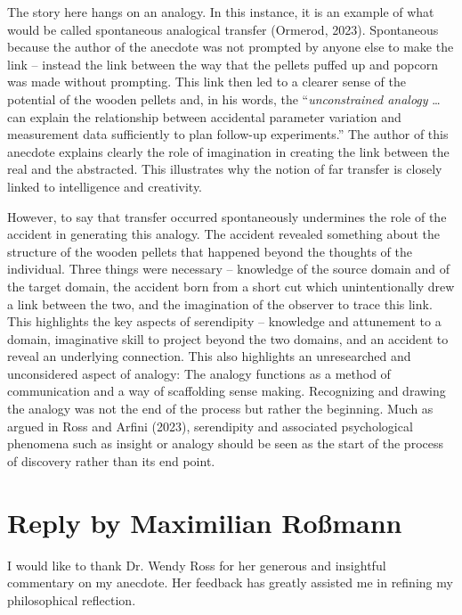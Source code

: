 \documentclass[authordate, commentary]{jote-new-article}
\begin{document}
	The story here hangs on an analogy. In this instance, it is an example of what would be called spontaneous analogical transfer (Ormerod, 2023). Spontaneous because the author of the anecdote was not prompted by anyone else to make the link -- instead the link between the way that the pellets puffed up and popcorn was made without prompting. This link then led to a clearer sense of the potential of the wooden pellets and, in his words, the “\emph{unconstrained analogy }… can explain the relationship between accidental parameter variation and measurement data sufficiently to plan follow-up experiments.” The author of this anecdote explains clearly the role of imagination in creating the link between the real and the abstracted. This illustrates why the notion of far transfer is closely linked to intelligence and creativity.



	However, to say that transfer occurred spontaneously undermines the role of the accident in generating this analogy. The accident revealed something about the structure of the wooden pellets that happened beyond the thoughts of the individual. Three things were necessary -- knowledge of the source domain and of the target domain, the accident born from a short cut which unintentionally drew a link between the two, and the imagination of the observer to trace this link. This highlights the key aspects of serendipity -- knowledge and attunement to a domain, imaginative skill to project beyond the two domains, and an accident to reveal an underlying connection. This also highlights an unresearched and unconsidered aspect of analogy: The analogy functions as a method of communication and a way of scaffolding sense making. Recognizing and drawing the analogy was not the end of the process but rather the beginning. Much as argued in Ross and Arfini (2023), serendipity and associated psychological phenomena such as insight or analogy should be seen as the start of the process of discovery rather than its end point.



	\section{Reply by Maximilian Roßmann}



	I would like to thank Dr. Wendy Ross for her generous and insightful commentary on my anecdote. Her feedback has greatly assisted me in refining my philosophical reflection.
\end{document}

